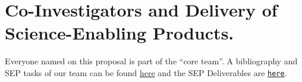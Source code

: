 \section*{Co-Investigators and Delivery of Science-Enabling Products.}
Everyone named on this proposal is part of the ``core team''. 
%
%
A bibliography and SEP tasks of our team can be found \href{https://github.com/d80b2t/JWST_ERS/blob/master/Proposal/CoI_bios.tex}{here} and the SEP Deliverables are \href{https://github.com/d80b2t/JWST_ERS/tree/master/Deliverables}{\tt here}. 

%



